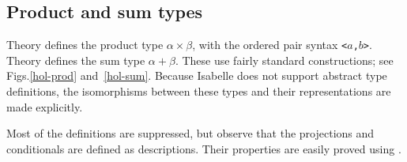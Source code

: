 \subsection{Product and sum types}
Theory  defines the product type $\alpha\times\beta$, with
the ordered pair syntax {\tt<$a$,$b$>}.  Theory  defines the
sum type $\alpha+\beta$.  These use fairly standard constructions; see
Figs.\ts\ref{hol-prod} and~\ref{hol-sum}.  Because Isabelle does not
support abstract type definitions, the isomorphisms between these types and
their representations are made explicitly.

Most of the definitions are suppressed, but observe that the projections
and conditionals are defined as descriptions.  Their properties are easily
proved using .  

